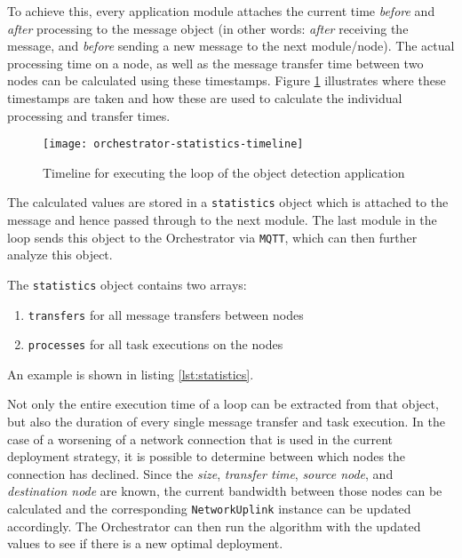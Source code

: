 To achieve this, every application module attaches the current time \textit{before} and \textit{after} processing to the message object (in other words: \textit{after} receiving the message, and \textit{before} sending a new message to the next module/node).
The actual processing time on a node, as well as the message transfer time between two nodes can be calculated using these timestamps.
Figure \ref{fig:orchestrator-statistics-timeline} illustrates where these timestamps are taken and how these are used to calculate the individual processing and transfer times.

\begin{figure}[h]
    \centering
    \texttt{[image: orchestrator-statistics-timeline]}
    \caption{Timeline for executing the loop of the object detection application}
    \label{fig:orchestrator-statistics-timeline}
\end{figure}

The calculated values are stored in a \texttt{statistics} object which is attached to the message and hence passed through to the next module.
The last module in the loop sends this object to the Orchestrator via \texttt{MQTT}, which can then further analyze this object.

The \texttt{statistics} object contains two arrays:
\begin{enumerate}
    \item \texttt{transfers} for all message transfers between nodes
    \item \texttt{processes} for all task executions on the nodes
\end{enumerate}

An example is shown in listing \ref{lst:statistics}.



Not only the entire execution time of a loop can be extracted from that object, but also the duration of every single message transfer and task execution.
In the case of a worsening of a network connection that is used in the current deployment strategy, it is possible to determine between which nodes the connection has declined.
Since the \textit{size}, \textit{transfer time}, \textit{source node}, and \textit{destination node} are known, the current bandwidth between those nodes can be calculated and the corresponding \texttt{NetworkUplink} instance can be updated accordingly.
The Orchestrator can then run the algorithm with the updated values to see if there is a new optimal deployment.